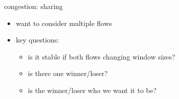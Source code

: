 \begin{frame}{congestion: sharing}
    \begin{itemize}
    \item want to consider multiple flows
    \vspace{.5cm}
    \item key questions:
        \begin{itemize}
        \item is it stable if both flows changing window sizes?
        \item is there one winner/loser?
        \item is the winner/loser who we want it to be?
        \end{itemize}
    \end{itemize}
\end{frame}
